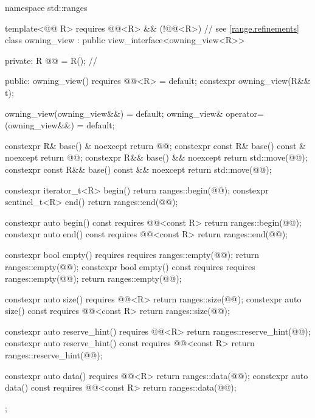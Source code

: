 %
\begin{codeblock}
namespace std::ranges {
  template<@@ R>
    requires @@<R> && (!@@<R>) // see \ref{range.refinements}
  class owning_view : public view_interface<owning_view<R>> {
  private:
    R @@ = R();         // \expos

  public:
    owning_view() requires @@<R> = default;
    constexpr owning_view(R&& t);

    owning_view(owning_view&&) = default;
    owning_view& operator=(owning_view&&) = default;

    constexpr R& base() & noexcept { return @@; }
    constexpr const R& base() const & noexcept { return @@; }
    constexpr R&& base() && noexcept { return std::move(@@); }
    constexpr const R&& base() const && noexcept { return std::move(@@); }

    constexpr iterator_t<R> begin() { return ranges::begin(@@); }
    constexpr sentinel_t<R> end() { return ranges::end(@@); }

    constexpr auto begin() const requires @@<const R>
    { return ranges::begin(@@); }
    constexpr auto end() const requires @@<const R>
    { return ranges::end(@@); }

    constexpr bool empty() requires requires { ranges::empty(@@); }
    { return ranges::empty(@@); }
    constexpr bool empty() const requires requires { ranges::empty(@@); }
    { return ranges::empty(@@); }

    constexpr auto size() requires @@<R>
    { return ranges::size(@@); }
    constexpr auto size() const requires @@<const R>
    { return ranges::size(@@); }

    constexpr auto reserve_hint() requires @@<R>
    { return ranges::reserve_hint(@@); }
    constexpr auto reserve_hint() const requires @@<const R>
    { return ranges::reserve_hint(@@); }

    constexpr auto data() requires @@<R>
    { return ranges::data(@@); }
    constexpr auto data() const requires @@<const R>
    { return ranges::data(@@); }
  };
}
\end{codeblock}

